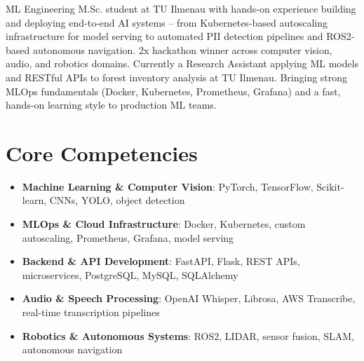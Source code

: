 \documentclass[11pt,a4paper,sans]{moderncv}
\begin{document}
\makecvtitle


\vspace{6pt}
\small{ML Engineering M.Sc. student at TU Ilmenau with hands-on experience building and deploying end-to-end AI systems -- from Kubernetes-based autoscaling infrastructure for model serving to automated PII detection pipelines and ROS2-based autonomous navigation. 2x hackathon winner across computer vision, audio, and robotics domains. Currently a Research Assistant applying ML models and RESTful APIs to forest inventory analysis at TU Ilmenau. Bringing strong MLOps fundamentals (Docker, Kubernetes, Prometheus, Grafana) and a fast, hands-on learning style to production ML teams.}


\section{Core Competencies}
\vspace{1pt}
\begin{itemize}

\item \textbf{Machine Learning \& Computer Vision}: PyTorch, TensorFlow, Scikit-learn, CNNs, YOLO, object detection

\item \textbf{MLOps \& Cloud Infrastructure}: Docker, Kubernetes, custom autoscaling, Prometheus, Grafana, model serving

\item \textbf{Backend \& API Development}: FastAPI, Flask, REST APIs, microservices, PostgreSQL, MySQL, SQLAlchemy

\item \textbf{Audio \& Speech Processing}: OpenAI Whisper, Librosa, AWS Transcribe, real-time transcription pipelines

\item \textbf{Robotics \& Autonomous Systems}: ROS2, LIDAR, sensor fusion, SLAM, autonomous navigation

\end{itemize}

\end{document}
